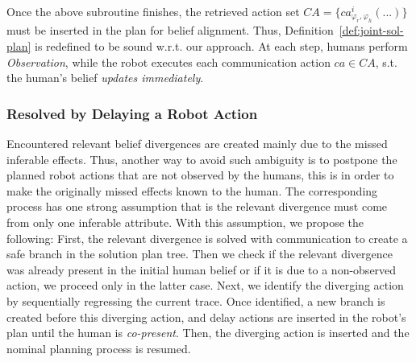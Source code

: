 \documentclass[letterpaper]{article} %
\begin{document}
Once the above subroutine finishes, the retrieved action set $\mathit{CA} = \{ca^{i}_{\varphi_r,\varphi_h}(...)\}$ must be inserted in the plan for belief alignment. Thus, Definition~\ref{def:joint-sol-plan} is redefined to be sound w.r.t. our approach. 
At each step,
humans perform \textit{Observation}, while the robot executes each communication action $ca \in \mathit{CA}$, s.t. the human's belief \textit{updates immediately}.


\subsubsection{Resolved by Delaying a Robot Action}

Encountered relevant belief divergences are created mainly due to the missed inferable effects. 
Thus, another way to avoid such ambiguity is to postpone the planned robot actions that are not observed by the humans, this is in order to make the originally missed effects known to the human. 
The corresponding process has one strong assumption that is the relevant divergence must come from only one inferable attribute. 
With this assumption, we propose the following: 
First, the relevant divergence is solved with communication to create a safe branch in the solution plan tree. 
Then we check if the relevant divergence was already present in the initial human belief or if it is due to a non-observed action, we proceed only in the latter case. 
Next, we identify the diverging action by sequentially regressing the current trace.
Once identified, a new branch is created before this diverging action, and {\sc delay} actions are inserted in the robot's plan until the human is \textit{co-present}. 
Then, the diverging action is inserted and the nominal planning process is resumed.
\end{document}
